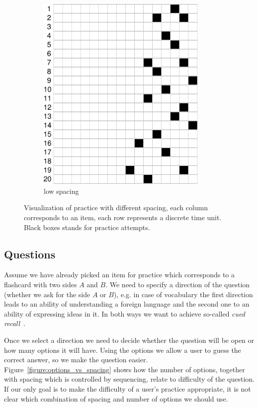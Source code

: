 \documentclass[table,color,cover,twoside,nolot,nolof]{fithesis3/fithesis3}
\begin{document}
\begin{figure}
\begin{subfigure}[b]{.5\textwidth}
		\includegraphics[width=0.9\textwidth]{figure/practice_progress_b}
		\caption{low spacing}
		\label{figure:practice_progress_b}
	\end{subfigure}
	\caption{Visualization of practice with different spacing, each column
		corresponds to an item, each row represents a discrete time unit. Black
		boxes stands for practice attempts.}
	\label{figure:practice_progress}
\end{figure}

\subsection{Questions}

Assume we have already picked an item for practice which corresponds to a
flashcard with two sides $A$ and $B$. We need to specify a direction of the
question (whether we ask for the side $A$ or $B$), e.g. in case of
vocabulary the first direction leads to an ability of understanding a foreign
language and the second one to an ability of expressing ideas in it. In both
ways we want to achieve so-called \emph{cued recall}~\cite{carpenter2006types}.

Once we select a direction we need to decide whether the question will be
open or how many options it will have. Using the options we allow a user
to guess the correct answer, so we make the question easier.
Figure~\ref{figure:options_vs_spacing} shows how the number of options,
together with spacing which is controlled by sequencing, relate to difficulty
of the question. If our only goal is to make the difficulty of a user's practice
appropriate, it is not clear which combination of spacing and number of options
we should use.
\end{document}
